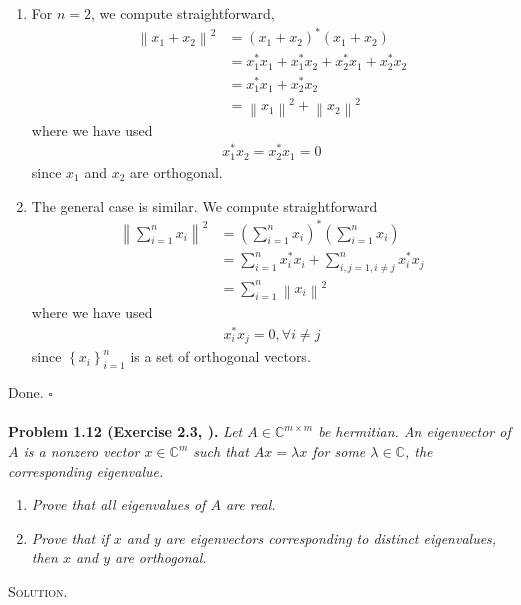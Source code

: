 \documentclass[a4paper,oneside]{book}
\numberwithin{equation}{chapter}
\begin{document}
\begin{enumerate}
\item For $n=2$, we compute straightforward,
\begin{align}
{\left\| {{x_1} + {x_2}} \right\|^2} &= {\left( {{x_1} + {x_2}} \right)^*}\left( {{x_1} + {x_2}} \right)\\
& = x_1^*{x_1} + x_1^*{x_2} + x_2^*{x_1} + x_2^*{x_2}\\
& = x_1^*{x_1} + x_2^*{x_2}\\
 &= {\left\| {{x_1}} \right\|^2} + {\left\| {{x_2}} \right\|^2}
\end{align}
where we have used
\begin{align}
x_1^*{x_2} = x_2^*{x_1} = 0
\end{align}
since $x_1$ and $x_2$ are orthogonal.
\item The general case is similar. We compute straightforward
\begin{align}
{\left\| {\sum\limits_{i = 1}^n {{x_i}} } \right\|^2} &= {\left( {\sum\limits_{i = 1}^n {{x_i}} } \right)^*}\left( {\sum\limits_{i = 1}^n {{x_i}} } \right)\\
 &= \sum\limits_{i = 1}^n {x_i^*{x_i}}  + \sum\limits_{i,j = 1,i \ne j}^n {x_i^*{x_j}} \\
 &= \sum\limits_{i = 1}^n {{{\left\| {{x_i}} \right\|}^2}} 
\end{align}
where we have used
\begin{align}
x_i^*{x_j} = 0,\forall i \ne j
\end{align}
since $\left\{ {{x_i}} \right\}_{i = 1}^n$ is a set of orthogonal vectors.
\end{enumerate}
Done. \hfill $\square$\\
\\
\textbf{Problem 1.12 (Exercise 2.3, \cite{1}).} \textit{Let $A \in \mathbb{C}^{m\times m}$ be hermitian. An eigenvector of $A$ is a nonzero vector $x \in \mathbb{C}^m$ such that $Ax=\lambda x$ for some $\lambda \in \mathbb{C}$, the corresponding eigenvalue.}
\begin{enumerate}
\item \textit{Prove that all eigenvalues of $A$ are real.}
\item \textit{Prove that if $x$ and $y$ are eigenvectors corresponding to distinct eigenvalues, then $x$ and $y$ are orthogonal.}
\end{enumerate}
\textsc{Solution.} 
\end{document}
